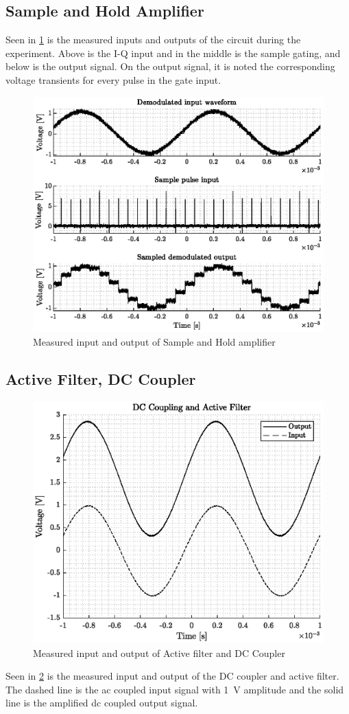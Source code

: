 \subsection{Sample and Hold Amplifier}
Seen in \cref{fig:4_sample_hold_pcb} is the measured inputs and outputs of the circuit during the experiment. Above is the I-Q input and in the middle is the sample gating, and below is the output signal. On the output signal, it is noted the corresponding voltage transients for every pulse in the gate input.
\begin{figure}[htbp]
	\centering
	\includegraphics[width=.8\textwidth]{Figures/4_sampler_pcb.eps}
	\caption{Measured input and output of Sample and Hold amplifier}
	\label{fig:4_sample_hold_pcb}
\end{figure}

\subsection{Active Filter, DC Coupler}
\begin{figure}
	\centering
	\includegraphics[width=.8\textwidth]{Figures/5_dccoupler_filter_measurement.eps}
	\caption{Measured input and output of Active filter and DC Coupler}
	\label{fig:5_dccoupler_measured}
\end{figure}
Seen in \cref{fig:5_dccoupler_measured} is the measured input and output of the DC coupler and active filter. The dashed line is the \gls{ac} coupled input signal with \qty{1}{\volt} amplitude and the solid line is the amplified \gls{dc} coupled output signal.


